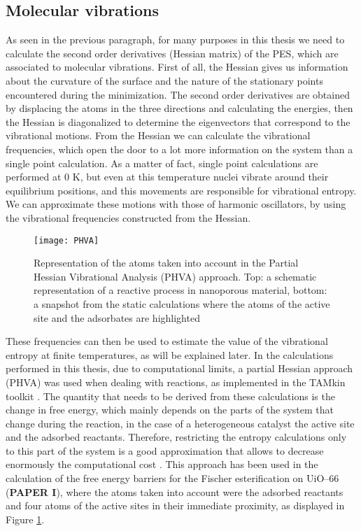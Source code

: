 \subsection*{Molecular vibrations}
As seen in the previous paragraph, for many purposes in this thesis we need to calculate the second order derivatives (Hessian matrix) of the PES, which are associated to molecular vibrations. First of all, the Hessian gives us information about the curvature of the surface and the nature of the stationary points encountered during the minimization. The second order derivatives are obtained by displacing the atoms in the three directions and calculating the energies, then the Hessian is diagonalized to determine the eigenvectors that correspond to the vibrational motions.
From the Hessian we can calculate the vibrational frequencies, which open the door to a lot more information on the system than a single point calculation. As a matter of fact, single point calculations are performed at 0 K, but even at this temperature nuclei vibrate around their equilibrium positions, and this movements are responsible for vibrational entropy. We can approximate these motions with those of harmonic oscillators, by using the vibrational frequencies constructed from the Hessian. 
\npar
\begin{figure}[!htbp]
	\centering
 	\texttt{[image: PHVA]}
	\caption{Representation of the atoms taken into account in the Partial Hessian Vibrational Analysis (PHVA) approach. Top: a schematic representation of a reactive process in nanoporous material, bottom: a snapshot from the static calculations where the atoms of the active site and the adsorbates are highlighted}
 \label{fig:PHVA}
\end{figure}
These frequencies can then be used to estimate the value of the vibrational entropy at finite temperatures, as will be explained later. In the calculations performed in this thesis, due to computational limits, a partial Hessian approach (PHVA) was used when dealing with reactions, as implemented in the TAMkin toolkit \cite{Ghysels2010}. The quantity that needs to be derived from these calculations is the change in free energy, which mainly depends on the parts of the system that change during the reaction, in the case of a heterogeneous catalyst the active site and the adsorbed reactants. Therefore, restricting the entropy calculations only to this part of the system is a good approximation that allows to decrease enormously the computational cost \cite{Ghysels2007}. This approach has been used in the calculation of the free energy barriers for the Fischer esterification on UiO--66 (\textbf{PAPER I}), where the atoms taken into account were the adsorbed reactants and four atoms of the active sites in their immediate proximity, as displayed in Figure \ref{fig:PHVA}.

